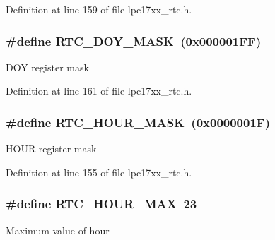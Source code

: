\-Definition at line 159 of file lpc17xx\-\_\-rtc.\-h.

\hypertarget{group___r_t_c___private___macros_ga7c8c3332f827ea092523b75ef953bd8b}{
\subsubsection[{\-R\-T\-C\-\_\-\-D\-O\-Y\-\_\-\-M\-A\-S\-K}]{\setlength{\rightskip}{0pt plus 5cm}\#define {\bf \-R\-T\-C\-\_\-\-D\-O\-Y\-\_\-\-M\-A\-S\-K}~(0x000001\-F\-F)}}\label{group___r_t_c___private___macros_ga7c8c3332f827ea092523b75ef953bd8b}
\-D\-O\-Y register mask 

\-Definition at line 161 of file lpc17xx\-\_\-rtc.\-h.

\hypertarget{group___r_t_c___private___macros_ga3c6fd786e3cb5f56b71474fc2d26a8a4}{
\subsubsection[{\-R\-T\-C\-\_\-\-H\-O\-U\-R\-\_\-\-M\-A\-S\-K}]{\setlength{\rightskip}{0pt plus 5cm}\#define {\bf \-R\-T\-C\-\_\-\-H\-O\-U\-R\-\_\-\-M\-A\-S\-K}~(0x0000001\-F)}}\label{group___r_t_c___private___macros_ga3c6fd786e3cb5f56b71474fc2d26a8a4}
\-H\-O\-U\-R register mask 

\-Definition at line 155 of file lpc17xx\-\_\-rtc.\-h.

\hypertarget{group___r_t_c___private___macros_ga35630c42240ce2e8f74c38e1731d7e68}{
\subsubsection[{\-R\-T\-C\-\_\-\-H\-O\-U\-R\-\_\-\-M\-A\-X}]{\setlength{\rightskip}{0pt plus 5cm}\#define {\bf \-R\-T\-C\-\_\-\-H\-O\-U\-R\-\_\-\-M\-A\-X}~23}}\label{group___r_t_c___private___macros_ga35630c42240ce2e8f74c38e1731d7e68}
\-Maximum value of hour 

